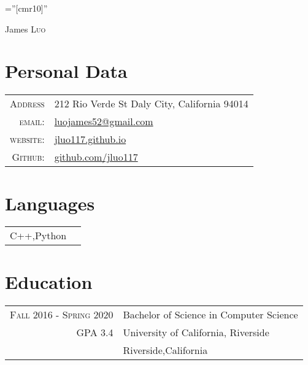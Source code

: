 \documentclass[a4paper,12pt]{article}
\begin{document}

\pagestyle{empty} %

\font\fb=''[cmr10]'' %

\par{\centering
    {\Huge James \textsc{Luo}
  }\bigskip\par}

\section{Personal Data}

\begin{tabular}{rl}
        \textsc{Address} & 212 Rio Verde St Daly City, California 94014\\
    \textsc{email:}     & \href{mailto:luojames52@gmail.com}{luojames52@gmail.com}\\
    \textsc{website:} &
    \href{https://jluo117.github.io}{jluo117.github.io}\\
    \textsc{Github:} &
    \href{https://github.com/jluo117}{github.com/jluo117}
\end{tabular}

\section{Languages}
\begin{tabular}{rl}

\textsc{C++},{Python} \\
\end{tabular}

\section{Education}
\begin{tabular}{rl}
\textsc{Fall 2016 - Spring 2020} & Bachelor of Science in Computer Science\\
\textsc{GPA 3.4}
& University of California, Riverside \\
& Riverside,California\\
\end{tabular}
\end{document}
